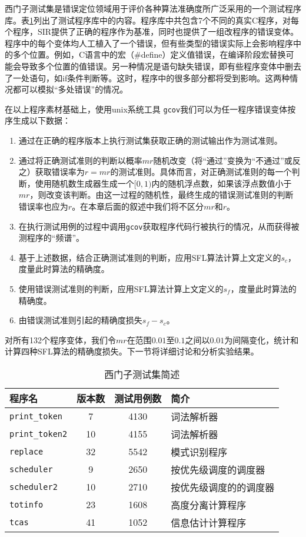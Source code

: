 西门子测试集是错误定位领域用于评价各种算法准确度所广泛采用的一个测试程序库。表\ref{Tab: Siemens}列出了测试程序库中的内容。程序库中共包含7个不同的真实C程序，对每个程序，SIR提供了正确的程序作为基准，同时也提供了一组改程序的错误变体。程序中的每个变体均人工植入了一个错误，但有些类型的错误实际上会影响程序中的多个位置。例如，C语言中的宏（\#define）定义值错误，在编译阶段宏替换可能会导致多个位置的值错误。另一种情况是语句缺失错误，即有些程序变体中删去了一处语句，如if条件判断等。这时，程序中的很多部分都将受到影响。这两种情况都可以模拟“多处错误”的情况。

在以上程序素材基础上，使用unix系统工具%
\texttt{gcov}我们可以为任一程序错误变体按序生成以下数据：
\begin{enumerate}
	\setlength{\itemsep}{0pt}
	\setlength{\parskip}{0pt}
	\setcounter{enumi}{0}
	\item 通过在正确的程序版本上执行测试集获取正确的测试输出作为测试准则。
	\item 通过将正确测试准则的判断以概率$mr$随机改变（将“通过”变换为“不通过”或反之）获取错误率为$r = mr$的测试准则。具体而言，对正确测试准则的每一个判断，使用随机数生成器生成一个$[0,1)$内的随机浮点数，如果该浮点数值小于$mr$，则改变该判断。由这一过程的随机性，最终生成的错误测试准则的判断错误率也应为$r$。在本章后面的叙述中我们将不区分$mr$和$r$。
	\item 在执行测试用例的过程中调用\texttt{gcov}获取程序代码行被执行的情况，从而获得被测程序的“频谱”。
	\item 基于上述数据，结合正确测试准则的判断，应用SFL算法计算上文定义的$s_c$，度量此时算法的精确度。
	\item 使用错误测试准则的判断，应用SFL算法计算上文定义的$s_f$，度量此时算法的精确度。
	\item 由错误测试准则引起的精确度损失$s_f - s_c$。
\end{enumerate}

对所有132个程序变体，我们令$mr$在范围$0.01$至$0.1$之间以$0.01$为间隔变化，统计和计算四种SFL算法的精确度损失。下一节将详细讨论和分析实验结果。

\begin{table}
	\caption{西门子测试集简述}\label{Tab: Siemens}
	\centering
	\begin{tabular}{l|c|c|l}
		\hline 程序名                & 版本数 & 测试用例数      & 简介 \\ 
		\hline \texttt{print\_token}  & 7        & 4130       & 词法解析器 \\ 
		\hline \texttt{print\_token2} & 10       & 4155       & 词法解析器\\
		\hline \texttt{replace}       & 32       & 5542       & 模式识别程序\\ 
		\hline \texttt{scheduler}     & 9        & 2650       & 按优先级调度的调度器 \\ 
		\hline \texttt{scheduler2}    & 10       & 2710       & 按优先级调度的的调度器 \\ 
		\hline \texttt{totinfo}       & 23       & 1608       & 高度分离计算程序 \\ 
		\hline \texttt{tcas}          & 41       & 1052       & 信息估计计算程序 \\ 
		\hline 
	\end{tabular}
\end{table}

